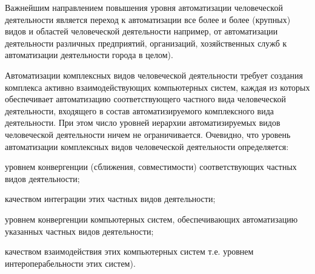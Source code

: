 Важнейшим направлением повышения уровня автоматизации человеческой деятельности является переход к автоматизации все более и более  (крупных) видов и областей человеческой деятельности например, от автоматизации деятельности различных предприятий, организаций, хозяйственных служб к автоматизации деятельности города в целом).

Автоматизации комплексных видов человеческой деятельности требует создания комплекса активно взаимодействующих компьютерных систем, каждая из которых обеспечивает автоматизацию соответствующего частного вида человеческой деятельности, входящего в состав автоматизируемого комплексного вида деятельности. При этом число уровней иерархии автоматизируемых видов человеческой деятельности ничем не ограничивается. Очевидно, что уровень автоматизации комплексных видов человеческой деятельности определяется:

\begin{textitemize}
	\item
	уровнем конвергенции (сближения, совместимости) соответствующих частных видов деятельности;
	\item
	качеством интеграции этих частных видов деятельности;
	\item
	уровнем конвергенции компьютерных систем, обеспечивающих автоматизацию указанных частных видов деятельности;
	\item
	качеством взаимодействия этих компьютерных систем т.е. уровнем интероперабельности этих систем).
\end{textitemize}

